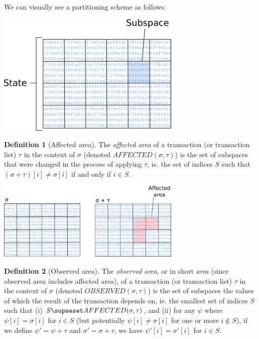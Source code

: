 \documentclass[11pt,a4paper]{article}
\theoremstyle{plain}
\theoremstyle{definition}
\newtheorem{defn}{Definition}[section]
\theoremstyle{remark}
\begin{document}
We can visually see a partitioning scheme as follows:

\begin{center}
\includegraphics[width=250pt]{subspace2.png}
\end{center}

\begin{defn}[Affected area]
The \emph{affected area} of a transaction (or transaction list) $\tau$ in the context of $\sigma$ (denoted $AFFECTED(\sigma, \tau)$) is the set of subspaces that were changed in the process of applying $\tau$, ie. the set of indices $S$ such that $(\sigma + \tau)[i] \ne \sigma[i]$ if and only if $i \in S$.
\end{defn}

\begin{center}
\includegraphics[width=250pt]{subspace1.png}
\end{center}

\begin{defn}[Observed area]
The \emph{observed area}, or in short \emph{area} (since observed area includes affected area), of a transaction (or transaction list) $\tau$ in the context of $\sigma$ (denoted $OBSERVED(\sigma, \tau)$) is the set of subspaces the values of which the result of the transaction depends on, ie. the smallest set of indices $S$ such that (i) $S \supseset AFFECTED(\sigma, \tau)$, and (ii) for any $\psi$ where $\psi[i] = \sigma[i]$ for $i \in S$ (but potentially $\psi[i] \ne \sigma[i]$ for one or more $i \notin S$), if we define $\psi' = \psi + \tau$ and $\sigma' = \sigma + \tau$, we have $\psi'[i] = \sigma'[i]$ for $i \in S$.
\end{defn}
\end{document}
